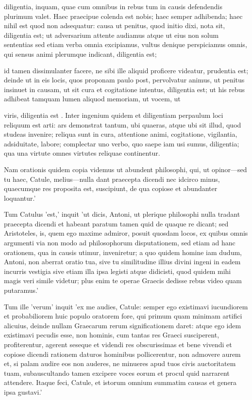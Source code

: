  diligentia, inquam, quae cum omnibus in rebus tum in causis defendendis plurimum valet. Haec praecipue colenda est nobis; haec semper adhibenda; haec nihil est quod non adsequatur: causa ut penitus, quod initio dixi, nota sit, diligentia est; ut adversarium attente audiamus atque ut eius non solum sententias sed etiam verba omnia excipiamus, vultus denique perspiciamus omnis, qui sensus animi plerumque indicant, diligentia est;

 id tamen dissimulanter facere, ne sibi ille aliquid proficere videatur, prudentia est; deinde ut in eis locis, quos proponam paulo post, pervolvatur animus, ut penitus insinuet in causam, ut sit cura et cogitatione intentus, diligentia est; ut his rebus adhibeat tamquam lumen aliquod memoriam, ut vocem, ut

 viris, diligentia est . Inter ingenium quidem et diligentiam perpaulum loci reliquum est arti: ars demonstrat tantum, ubi quaeras, atque ubi sit illud, quod studeas invenire; reliqua sunt in cura, attentione animi, cogitatione, vigilantia, adsiduitate, labore; complectar uno verbo, quo saepe iam usi sumus, diligentia; qua una virtute omnes virtutes reliquae continentur.

 Nam orationis quidem copia videmus ut abundent philosophi, qui, ut opinor—sed tu haec, Catule, melius—nulla dant praecepta dicendi nec idcirco minus, quaecumque res proposita est, suscipiunt, de qua copiose et abundanter loquantur.'

 Tum Catulus 'est,' inquit 'ut dicis, Antoni, ut plerique philosophi nulla tradant praecepta dicendi et habeant paratum tamen quid de quaque re dicant; sed Aristoteles, is, quem ego maxime admiror, posuit quosdam locos, ex quibus omnis argumenti via non modo ad philosophorum disputationem, sed etiam ad hanc orationem, qua in causis utimur, inveniretur; a quo quidem homine iam dudum, Antoni, non aberrat oratio tua, sive tu similitudine illius divini ingeni in eadem incurris vestigia sive etiam illa ipsa legisti atque didicisti, quod quidem mihi magis veri simile videtur; plus enim te operae Graecis dedisse rebus video quam putaramus.'

 Tum ille 'verum' inquit 'ex me audies, Catule: semper ego existimavi iucundiorem et probabiliorem huic populo oratorem fore, qui primum quam minimam artifici alicuius, deinde nullam Graecarum rerum significationem daret: atque ego idem existimavi pecudis esse, non hominis, cum tantas res Graeci susciperent, profiterentur, agerent seseque et videndi res obscurissimas et bene vivendi et copiose dicendi rationem daturos hominibus pollicerentur, non admovere aurem et, si palam audire eos non auderes, ne minueres apud tuos civis auctoritatem tuam, subauscultando tamen excipere voces eorum et procul quid narrarent attendere. Itaque feci, Catule, et istorum omnium summatim causas et genera ipsa gustavi.'

